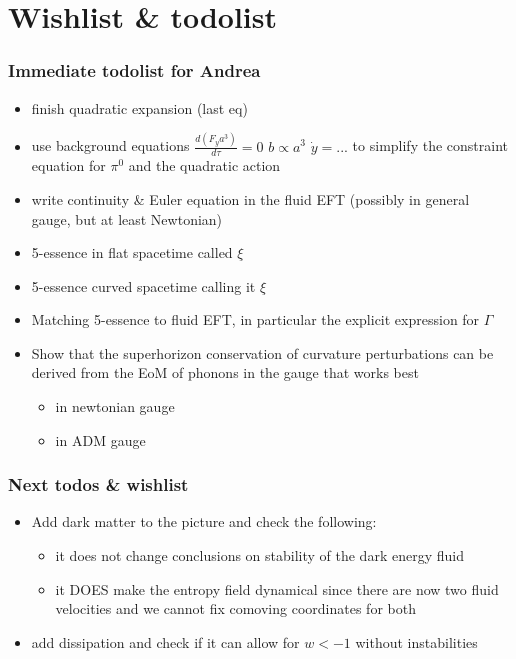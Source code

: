 \section{Wishlist \& todolist}


\subsubsection*{Immediate todolist for Andrea}
\begin{itemize}
    \item finish quadratic expansion (last eq)
    \item use background equations $\tfrac{d(F_ya^3)}{d\tau}=0$ $b\propto a^3$ $\dot{y}=...$ to simplify the constraint equation for $\pi^0$ and the quadratic action 
    \item write continuity \& Euler equation in the fluid EFT  (possibly in general gauge, but at least Newtonian)
    \item 5-essence in flat spacetime called $\xi$
    \item 5-essence curved spacetime calling it $\xi$
    \item Matching 5-essence to fluid EFT, in particular the explicit expression for $\Gamma$ 
    \item Show that the superhorizon conservation of curvature perturbations can be derived from the EoM of phonons in the gauge that works best
    \begin{itemize}
        \item in newtonian gauge
        \item in ADM gauge
    \end{itemize}
\end{itemize}   

\subsubsection*{Next todos \& wishlist}
\begin{itemize}
    \item Add dark matter to the picture and check the following:
    \begin{itemize}
        \item it does not change conclusions on stability of the dark energy fluid
        \item it DOES make the entropy field dynamical since there are now two fluid velocities and we cannot fix comoving coordinates for both
    \end{itemize}
    \item add dissipation and check if it can allow for $w<-1$ without instabilities
\end{itemize}